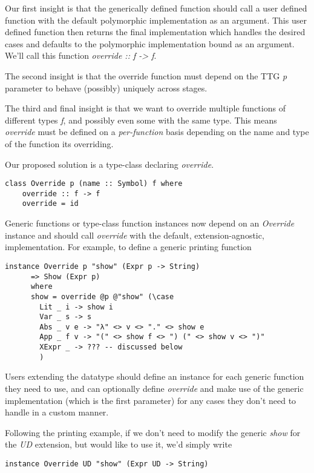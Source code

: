 \documentclass{article}
\begin{document}
Our first insight is that the generically defined function should call a user
defined function with the default polymorphic implementation as an argument.
This user defined function then returns the final implementation which handles
the desired cases and defaults to the polymorphic implementation bound as an
argument. We'll call this function \emph{override :: f -> f}.

The second insight is that the override function must depend on the TTG \emph{p}
parameter to behave (possibly) uniquely across stages.

The third and final insight is that we want to override multiple
functions of different types \emph{f}, and possibly even some with the same
type. This means \emph{override} must be defined on a \emph{per-function} basis
depending on the name and type of the function its overriding.

Our proposed solution is a type-class declaring \emph{override}.

\begin{lstlisting}
class Override p (name :: Symbol) f where
    override :: f -> f
    override = id
\end{lstlisting}

Generic functions or type-class function instances now depend on an \emph{Override}
instance and should call \emph{override} with the default, extension-agnostic,
implementation. For example, to define a generic printing function

\begin{lstlisting}
instance Override p "show" (Expr p -> String)
      => Show (Expr p)
      where
      show = override @p @"show" (\case
        Lit _ i -> show i
        Var _ s -> s
        Abs _ v e -> "λ" <> v <> "." <> show e
        App _ f v -> "(" <> show f <> ") (" <> show v <> ")"
        XExpr _ -> ??? -- discussed below
        )
\end{lstlisting}

Users extending the datatype should define an instance for
each generic function they need to use, and can optionally define
\emph{override} and make use of the generic implementation (which is the first
parameter) for any cases they don't need to handle in a custom manner.

Following the printing example, if we don't need to modify the generic
\emph{show} for the \emph{UD} extension, but would like to use it, we'd simply
write
\begin{lstlisting}
instance Override UD "show" (Expr UD -> String)
\end{lstlisting}
\end{document}

